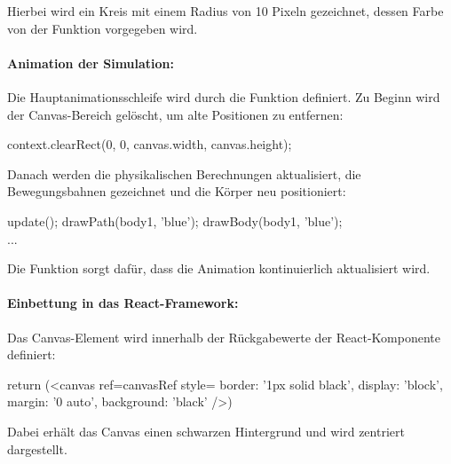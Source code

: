 \documentclass[a4paper,12pt,twoside]{article}
\begin{document}
Hierbei wird ein Kreis mit einem Radius von 10 Pixeln gezeichnet, dessen Farbe von der Funktion vorgegeben wird.

\paragraph{Animation der Simulation:}
Die Hauptanimationsschleife wird durch die Funktion  definiert. Zu Beginn wird der Canvas-Bereich gelöscht, um alte Positionen zu entfernen:

\begin{javascript}
context.clearRect(0, 0, canvas.width, canvas.height);
\end{javascript}

Danach werden die physikalischen Berechnungen aktualisiert, die Bewegungsbahnen gezeichnet und die Körper neu positioniert:

\begin{javascript}
update();
drawPath(body1, 'blue');
drawBody(body1, 'blue');
\\...
\end{javascript}

Die Funktion  sorgt dafür, dass die Animation kontinuierlich aktualisiert wird.

\paragraph{Einbettung in das React-Framework:}
Das Canvas-Element wird innerhalb der Rückgabewerte der React-Komponente definiert:

\begin{javascript}
return (<canvas ref={canvasRef} style={{ border: '1px solid black', display: 'block', margin: '0 auto', background: 'black' }} />)
\end{javascript}
Dabei erhält das Canvas einen schwarzen Hintergrund und wird zentriert dargestellt.
\end{document}
